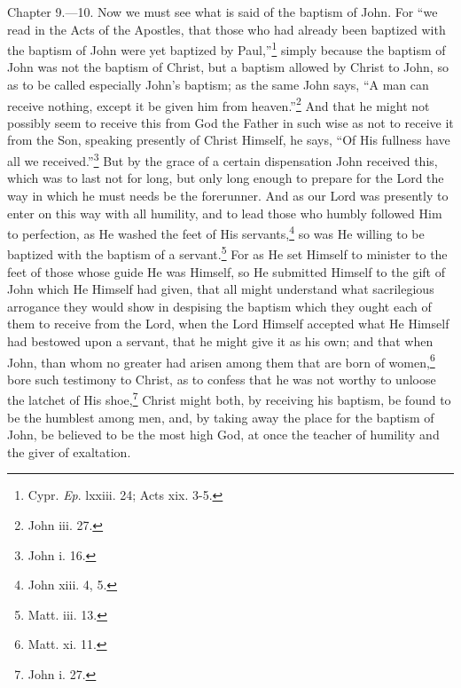 Chapter 9.—10. Now we must see what is said of the baptism of John. For ``we read in the Acts of the Apostles, that those who had already been baptized with the baptism of John were yet baptized by Paul,''\footnote{\par  Cypr. \emph{Ep}. lxxiii. 24; Acts xix. 3-5.} simply because the baptism of John was not the baptism of Christ, but a baptism allowed by Christ to John, so as to be called especially John’s baptism; as the same John says, ``A man can receive nothing, except it be given him from heaven.''\footnote{\par  John iii. 27.} And that he might not possibly seem to receive this from God the Father in such wise as not to receive it from the Son, speaking presently of Christ Himself, he says, ``Of His fullness have all we received.''\footnote{\par  John i. 16.} But by the grace of a certain dispensation John received this, which was to last not for long, but only long enough to prepare for the Lord the way in which he must needs be the forerunner. And as our Lord was presently to enter on this way with all humility, and to lead those who humbly followed Him to perfection, as He washed the feet of His servants,\footnote{\par  John xiii. 4, 5.} so was He willing to be baptized with the baptism of a servant.\footnote{\par  Matt. iii. 13.} For as He set Himself to minister to the feet of those whose guide He was Himself, so He submitted Himself to the gift of John which He Himself had given, that all might understand what sacrilegious arrogance they would show in despising the baptism which they ought each of them to receive from the Lord, when the Lord Himself accepted what He Himself had bestowed upon a servant, that he might give it as his own; and that when John, than whom no greater had arisen among them that are born of women,\footnote{\par  Matt. xi. 11.} bore such testimony to Christ, as to confess that he was not worthy to unloose the latchet of His shoe,\footnote{\par  John i. 27.} Christ might both, by receiving his baptism, be found to be the humblest among men, and, by taking away the place for the baptism of John, be believed to be the most high God, at once the teacher of humility and the giver of exaltation.

